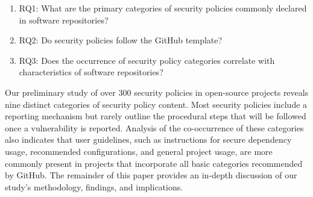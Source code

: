 \begin{enumerate}
\item RQ1: What are the primary categories of security policies commonly declared in software repositories?


\item RQ2: Do security policies follow the GitHub template?

\item RQ3: Does the occurrence of security policy categories correlate with characteristics of software repositories?
\end{enumerate}

Our preliminary study of over 300 security policies in open-source projects reveals nine distinct categories of security policy content. Most security policies include a reporting mechanism but rarely outline the procedural steps that will be followed once a vulnerability is reported. Analysis of the co-occurrence of these categories also indicates that user guidelines, such as instructions for secure dependency usage, recommended configurations, and general project usage, are more commonly present in projects that incorporate all basic categories recommended by GitHub. The remainder of this paper provides an in-depth discussion of our study's methodology, findings, and implications.







